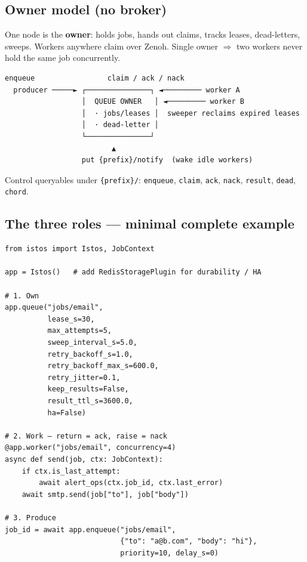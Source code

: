 \documentclass[11pt,a4paper]{article}
\begin{document}
\subsection{Owner model (no broker)}

One node is the \textbf{owner}: holds jobs, hands out claims, tracks leases,
dead-letters, sweeps. Workers anywhere claim over Zenoh. Single owner $\Rightarrow$
two workers never hold the same job concurrently.

\begin{lstlisting}[language={}]
        enqueue                 claim / ack / nack
  producer ─────► ┌───────────────┐ ◄───────── worker A
                  │  QUEUE OWNER   │ ◄───────── worker B
                  │  · jobs/leases │  sweeper reclaims expired leases
                  │  · dead-letter │
                  └───────────────┘
                         ▲
                  put {prefix}/notify  (wake idle workers)
\end{lstlisting}

Control queryables under \texttt{\{prefix\}/}: \texttt{enqueue}, \texttt{claim},
\texttt{ack}, \texttt{nack}, \texttt{result}, \texttt{dead}, \texttt{chord}.

\subsection{The three roles --- minimal complete example}

\begin{lstlisting}
from istos import Istos, JobContext

app = Istos()   # add RedisStoragePlugin for durability / HA

# 1. Own
app.queue("jobs/email",
          lease_s=30,
          max_attempts=5,
          sweep_interval_s=5.0,
          retry_backoff_s=1.0,
          retry_backoff_max_s=600.0,
          retry_jitter=0.1,
          keep_results=False,
          result_ttl_s=3600.0,
          ha=False)

# 2. Work — return = ack, raise = nack
@app.worker("jobs/email", concurrency=4)
async def send(job, ctx: JobContext):
    if ctx.is_last_attempt:
        await alert_ops(ctx.job_id, ctx.last_error)
    await smtp.send(job["to"], job["body"])

# 3. Produce
job_id = await app.enqueue("jobs/email",
                           {"to": "a@b.com", "body": "hi"},
                           priority=10, delay_s=0)
\end{lstlisting}
\end{document}
